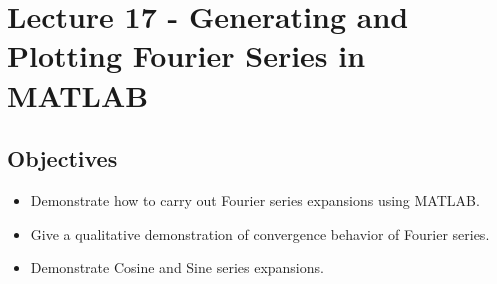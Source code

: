 \chapter{Lecture 17 - Generating and Plotting Fourier Series in MATLAB}
\label{ch:lec17}
\section{Objectives}
\begin{itemize}
\item Demonstrate how to carry out Fourier series expansions using MATLAB.
\item Give a qualitative demonstration of convergence behavior of Fourier series.
\item Demonstrate Cosine and Sine series expansions.
\end{itemize}
